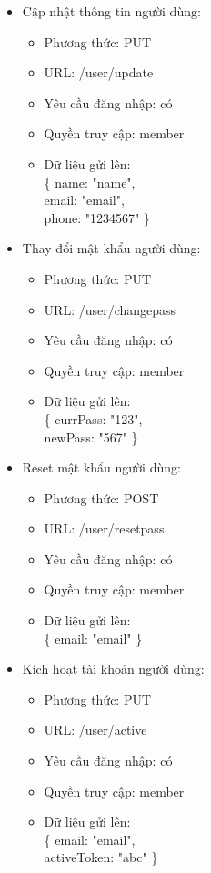 \documentclass[a4paper,12pt,oneside]{article}
\begin{document}
\begin{itemize}
\begin{itemize}
\begin{itemize}
	\end{itemize}
	
\item Cập nhật thông tin người dùng: 
	\begin{itemize}
	\item Phương thức: PUT
	\item URL: /user/update
	\item Yêu cầu đăng nhập: có
	\item Quyền truy cập: member
	\item Dữ liệu gửi lên:\\ 
		\{
  			name: "name",\\
  			email: "email",\\
  			phone: "1234567"
		\}

	\end{itemize}
	
\item Thay đổi mật khẩu người dùng: 
	\begin{itemize}
	\item Phương thức: PUT
	\item URL: /user/changepass
	\item Yêu cầu đăng nhập: có
	\item Quyền truy cập: member
	\item Dữ liệu gửi lên:\\ 
		\{
  			currPass: "123",\\
  			newPass: "567"
		\}

	\end{itemize}

\item Reset mật khẩu người dùng:
	\begin{itemize}
	\item Phương thức: POST
	\item URL: /user/resetpass
	\item Yêu cầu đăng nhập: có
	\item Quyền truy cập: member
	\item Dữ liệu gửi lên:\\ 
		\{
  			email: "email"
		\}
	\end{itemize}

\item Kích hoạt tài khoản người dùng:
	\begin{itemize}
	\item Phương thức: PUT
	\item URL: /user/active
	\item Yêu cầu đăng nhập: có
	\item Quyền truy cập: member
	\item Dữ liệu gửi lên:\\ 
		\{
  			email: "email",\\
  			activeToken: "abc"
		\}
	\end{itemize}


\end{itemize}
\end{itemize}
\end{document}
